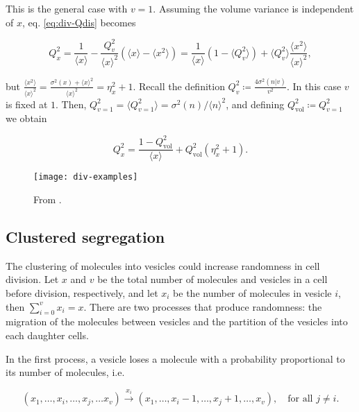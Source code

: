 This is the general case with $v=1$. Assuming the volume variance is independent of $x$, eq. \eqref{eq:div-Qdis} becomes

\begin{equation*}
  Q_x^2 = \frac{1}{\langle x\rangle} - \frac{Q_v^2}{\langle x\rangle^2}\left(\langle x\rangle  - \langle x^2\rangle\right) = \frac{1}{\langle x\rangle}\left(1-\langle Q_v^2\rangle\right) + \langle Q_v^2\rangle\frac{\langle x^2\rangle}{\langle x\rangle^2},
\end{equation*}

but $\frac{\langle x^2\rangle}{\langle x\rangle^2} = \frac{\sigma^2(x) + \langle x\rangle^2}{\langle x\rangle^2} = \eta_x^2 + 1$. Recall the definition  $Q_v^2 \coloneqq \frac{4\sigma^2(n|v)}{v^2}$. In this case $v$ is fixed at $1$. Then, $Q_{v=1}^2 = \langle Q_{v=1}^2\rangle = \sigma^2(n)/\langle n\rangle^2$, and defining $Q^2_\text{vol}\coloneqq Q_{v=1}^2$ we obtain

\begin{equation*}
  Q_x^2 = \frac{1-Q_\text{vol}^2}{\langle x\rangle} + Q_\text{vol}^2(\eta^2_x+1).
\end{equation*}


\begin{figure}[H]
  \centering
  \texttt{[image: div-examples]}
  \caption[FILL]{\label{fig:div-examples} From \cite{pedraza08}.}
\end{figure}

\subsection{Clustered segregation}

The clustering of molecules into vesicles could increase randomness in cell division. Let $x$ and $v$ be the total number of molecules and vesicles in a cell before division, respectively, and let $x_i$ be the number of molecules in vesicle $i$, then $\sum_{i=0}^vx_i=x$. There are two processes that produce randomness: the migration of the molecules between vesicles and the partition of the vesicles into each daughter cells.

In the first process, a vesicle loses a molecule with a probability proportional to its number of molecules, i.e.

\begin{equation}
  \label{eq:div-vesicle_switch}
  (x_1,\dotsc,x_i,\dotsc,x_j,\dotsc x_v) \xrightarrow{x_i} (x_1,\dotsc,x_i-1,\dotsc,x_j+1,\dotsc, x_v),\quad \text{for all } j\neq i.
\end{equation}

